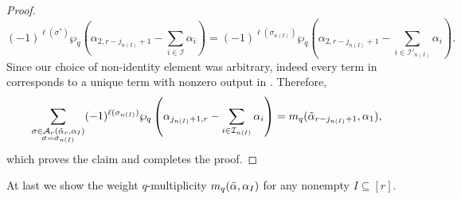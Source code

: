\documentclass[10pt]{article}
\newcommand{\hr}[0]{\Tilde{\alpha}}
\newcommand{\qpartition}[1]{\wp_q\left(#1\right)}
\begin{document}
\begin{proof}
    \begin{equation*}
        (-1)^{\ell(\sigma^*)}\qpartition{\alpha_{2,r-j_{n(I)}+1}-\sum_{i\in\mathcal{I}}\alpha_i}
        =(-1)^{\ell(\sigma_{n(I)})}\qpartition{\alpha_{2,r-j_{n(I)}+1}-\sum_{i\in\mathcal{I}'_{n(I)}}\alpha_i}.
    \end{equation*}
    Since our choice of non-identity element was arbitrary, indeed every term in  corresponds to a unique term with nonzero output in . Therefore,
    \begin{equation*}
        \sum_{\substack{\sigma\in\mathcal{A}_r(\hr_r,\alpha_I)\\\sigma=\sigma_{n(I)}}}(-1)^{\ell(\sigma_{n(I)})}\qpartition{\alpha_{j_{n(I)}+1,r}-\sum_{i\in\mathcal{I}_{n(I)}}\alpha_i}=m_q(\hr_{r-j_{n(I)}+1},\alpha_1),
    \end{equation*}
    which proves the claim and completes the proof.
\end{proof}
At last we show the weight $q$-multiplicity $m_q(\hr,\alpha_I)$ for any nonempty $I\subseteq [r]$.
\THEBIGONE
\end{document}
